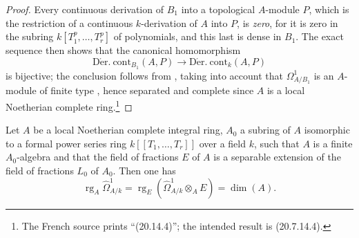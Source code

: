 \begin{proof}
Every continuous derivation of $B_1$ into a topological $A$-module $P$, which is the restriction of a continuous $k$-derivation of $A$ into $P$, is \emph{zero}, for it is zero in the subring $k[T_1^p,\ldots,T_r^p]$ of polynomials, and this last is dense in $B_1$.
The exact sequence  then shows that the canonical homomorphism
\[
  \operatorname{D\acute{e}r.\ cont}_{B_1}(A,P)\to\operatorname{D\acute{e}r.\ cont}_k(A,P)
\]
is bijective; the conclusion follows from , taking into account that $\Omega^1_{A/B_1}$ is an $A$-module of finite type , hence separated and complete since $A$ is a local Noetherian complete ring.\footnote{The French source prints ``(20.14.4)''; the intended result is (20.7.14.4).}
\end{proof}

\begin{proposition}[21.9.5]
\label{0.21.9.5}
Let $A$ be a local Noetherian complete integral ring, $A_0$ a subring of $A$ isomorphic to a formal power series ring $k[[T_1,\ldots,T_r]]$ over a field $k$, such that $A$ is a finite $A_0$-algebra and that the field of fractions $E$ of $A$ is a separable extension of the field of fractions $L_0$ of $A_0$.
Then one has
\begin{equation}
\tag{21.9.5.1}
  \label{0.21.9.5.1}
  \operatorname{rg}_A\widehat{\Omega}^1_{A/k}=\operatorname{rg}_E(\widehat{\Omega}^1_{A/k}\otimes_A E)=\dim(A).
\end{equation}
\end{proposition}

